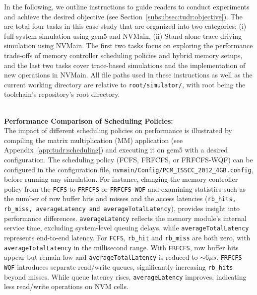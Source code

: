 In the following, we outline instructions to guide readers to conduct experiments and achieve the desired objective (see Section~\cref{subsubsec:tudr:objective}). The are total four tasks in this case study that are organized into two categories: (i) full-system simulation using gem5 and NVMain, (ii) Stand-alone trace-driving simulation using NVMain. The first two tasks focus on exploring the performance trade-offs of memory controller scheduling policies and hybrid memory setups, and the last two tasks cover trace-based simulations and the implementation of new operations in NVMain. All file paths used in these instructions as well as the current working directory are relative to \texttt{root/simulator/}, with root being the toolchain's repository's root directory. 

~\\\noindent \textbf{Performance Comparison of Scheduling Policies:}\\
The impact of different scheduling policies on performance is illustrated by compiling the matrix multiplication (MM) application (see Appendix~\ref{app:tudr:scheduling}) and executing it on gem5 with a desired configuration. The scheduling policy (FCFS, FRFCFS, or FRFCFS-WQF) can be configured in the configuration file, \texttt{nvmain/Config/PCM\_ISSCC\_2012\_4GB.config}, before running any simulation. For instance, changing the memory controller policy from the \texttt{FCFS} to \texttt{FRFCFS} or \texttt{FRFCFS-WQF} and examining statistics such as the number of row buffer hits and misses and the access latencies (\texttt{rb\_hits, rb\_miss, averageLatency and averageTotalLatency}), provides insight into performance differences.
\texttt{averageLatency} reflects the memory module's internal service time, excluding system-level queuing delays, while \texttt{averageTotalLatency} represents end-to-end latency.  
For \texttt{FCFS}, \texttt{rb\_hit} and \texttt{rb\_miss} are both zero, with \texttt{averageTotalLatency} in the millisecond range.  
With \texttt{FRFCFS}, row buffer hits appear but remain low and \texttt{averageTotalLatency} is reduced to $\sim6\mu s$.  
\texttt{FRFCFS-WQF} introduces separate read/write queues, significantly increasing \texttt{rb\_hits} beyond misses. While queue latency rises, \texttt{averageLatency} improves, indicating less read/write operations on NVM cells.  













